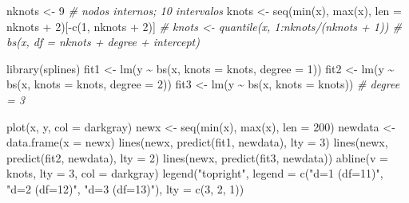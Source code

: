 \documentclass[
  spanish,
]{book}
\newenvironment{Shaded}{\begin{snugshade}}{\end{snugshade}}
\newcommand{\AttributeTok}[1]{\textcolor[rgb]{0.77,0.63,0.00}{#1}}
\newcommand{\CommentTok}[1]{\textcolor[rgb]{0.56,0.35,0.01}{\textit{#1}}}
\newcommand{\DecValTok}[1]{\textcolor[rgb]{0.00,0.00,0.81}{#1}}
\newcommand{\FunctionTok}[1]{\textcolor[rgb]{0.00,0.00,0.00}{#1}}
\newcommand{\NormalTok}[1]{#1}
\newcommand{\OtherTok}[1]{\textcolor[rgb]{0.56,0.35,0.01}{#1}}
\newcommand{\SpecialCharTok}[1]{\textcolor[rgb]{0.00,0.00,0.00}{#1}}
\newcommand{\StringTok}[1]{\textcolor[rgb]{0.31,0.60,0.02}{#1}}
\theoremstyle{break}
\theoremstyle{definition}
\theoremstyle{definition}
\theoremstyle{definition}
\theoremstyle{definition}
\theoremstyle{remark}
\begin{document}
\begin{Shaded}
\begin{Highlighting}[]
\NormalTok{nknots }\OtherTok{\textless{}{-}} \DecValTok{9} \CommentTok{\# nodos internos; 10 intervalos}
\NormalTok{knots }\OtherTok{\textless{}{-}} \FunctionTok{seq}\NormalTok{(}\FunctionTok{min}\NormalTok{(x), }\FunctionTok{max}\NormalTok{(x), }\AttributeTok{len =}\NormalTok{ nknots }\SpecialCharTok{+} \DecValTok{2}\NormalTok{)[}\SpecialCharTok{{-}}\FunctionTok{c}\NormalTok{(}\DecValTok{1}\NormalTok{, nknots }\SpecialCharTok{+} \DecValTok{2}\NormalTok{)]}
\CommentTok{\# knots \textless{}{-} quantile(x, 1:nknots/(nknots + 1)) \# bs(x, df = nknots + degree + intercept)}

\FunctionTok{library}\NormalTok{(splines)}
\NormalTok{fit1 }\OtherTok{\textless{}{-}} \FunctionTok{lm}\NormalTok{(y }\SpecialCharTok{\textasciitilde{}} \FunctionTok{bs}\NormalTok{(x, }\AttributeTok{knots =}\NormalTok{ knots, }\AttributeTok{degree =} \DecValTok{1}\NormalTok{))}
\NormalTok{fit2 }\OtherTok{\textless{}{-}} \FunctionTok{lm}\NormalTok{(y }\SpecialCharTok{\textasciitilde{}} \FunctionTok{bs}\NormalTok{(x, }\AttributeTok{knots =}\NormalTok{ knots, }\AttributeTok{degree =} \DecValTok{2}\NormalTok{))}
\NormalTok{fit3 }\OtherTok{\textless{}{-}} \FunctionTok{lm}\NormalTok{(y }\SpecialCharTok{\textasciitilde{}} \FunctionTok{bs}\NormalTok{(x, }\AttributeTok{knots =}\NormalTok{ knots)) }\CommentTok{\# degree = 3}

\FunctionTok{plot}\NormalTok{(x, y, }\AttributeTok{col =} \StringTok{\textquotesingle{}darkgray\textquotesingle{}}\NormalTok{)}
\NormalTok{newx }\OtherTok{\textless{}{-}} \FunctionTok{seq}\NormalTok{(}\FunctionTok{min}\NormalTok{(x), }\FunctionTok{max}\NormalTok{(x), }\AttributeTok{len =} \DecValTok{200}\NormalTok{)}
\NormalTok{newdata }\OtherTok{\textless{}{-}} \FunctionTok{data.frame}\NormalTok{(}\AttributeTok{x =}\NormalTok{ newx)}
\FunctionTok{lines}\NormalTok{(newx, }\FunctionTok{predict}\NormalTok{(fit1, newdata), }\AttributeTok{lty =} \DecValTok{3}\NormalTok{)}
\FunctionTok{lines}\NormalTok{(newx, }\FunctionTok{predict}\NormalTok{(fit2, newdata), }\AttributeTok{lty =} \DecValTok{2}\NormalTok{)}
\FunctionTok{lines}\NormalTok{(newx, }\FunctionTok{predict}\NormalTok{(fit3, newdata))}
\FunctionTok{abline}\NormalTok{(}\AttributeTok{v =}\NormalTok{ knots, }\AttributeTok{lty =} \DecValTok{3}\NormalTok{, }\AttributeTok{col =} \StringTok{\textquotesingle{}darkgray\textquotesingle{}}\NormalTok{)}
\FunctionTok{legend}\NormalTok{(}\StringTok{"topright"}\NormalTok{, }\AttributeTok{legend =} \FunctionTok{c}\NormalTok{(}\StringTok{"d=1 (df=11)"}\NormalTok{, }\StringTok{"d=2 (df=12)"}\NormalTok{, }\StringTok{"d=3 (df=13)"}\NormalTok{), }
       \AttributeTok{lty =} \FunctionTok{c}\NormalTok{(}\DecValTok{3}\NormalTok{, }\DecValTok{2}\NormalTok{, }\DecValTok{1}\NormalTok{))}
\end{Highlighting}
\end{Shaded}
\end{document}
